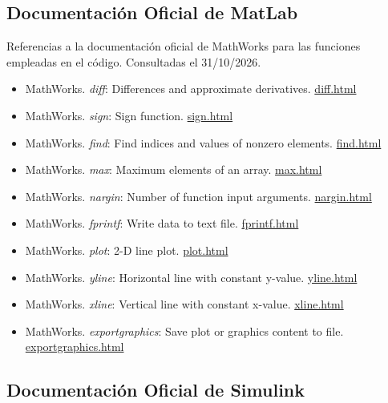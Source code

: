 \documentclass[12pt,a4paper]{article}
\begin{document}
\subsection{Documentación Oficial de MatLab}

Referencias a la documentación oficial de MathWorks para las funciones empleadas en el código. Consultadas el 31/10/2026.

\begin{itemize}[label=$\bullet$]
  \item MathWorks. \textit{diff}: Differences and approximate derivatives. \href{https://www.mathworks.com/help/matlab/ref/diff.html}{diff.html}
  \item MathWorks. \textit{sign}: Sign function. \href{https://www.mathworks.com/help/matlab/ref/sign.html}{sign.html}
  \item MathWorks. \textit{find}: Find indices and values of nonzero elements. \href{https://www.mathworks.com/help/matlab/ref/find.html}{find.html}
  \item MathWorks. \textit{max}: Maximum elements of an array. \href{https://www.mathworks.com/help/matlab/ref/max.html}{max.html}
  \item MathWorks. \textit{nargin}: Number of function input arguments. \href{https://www.mathworks.com/help/matlab/ref/nargin.html}{nargin.html}
  \item MathWorks. \textit{fprintf}: Write data to text file. \href{https://www.mathworks.com/help/matlab/ref/fprintf.html}{fprintf.html}
  \item MathWorks. \textit{plot}: 2-D line plot. \href{https://www.mathworks.com/help/matlab/ref/plot.html}{plot.html}
  \item MathWorks. \textit{yline}: Horizontal line with constant y-value. \href{https://www.mathworks.com/help/matlab/ref/yline.html}{yline.html}
  \item MathWorks. \textit{xline}: Vertical line with constant x-value. \href{https://www.mathworks.com/help/matlab/ref/xline.html}{xline.html}
  \item MathWorks. \textit{exportgraphics}: Save plot or graphics content to file. \href{https://www.mathworks.com/help/matlab/ref/exportgraphics.html}{exportgraphics.html}
\end{itemize}

\subsection{Documentación Oficial de Simulink}
\end{document}
